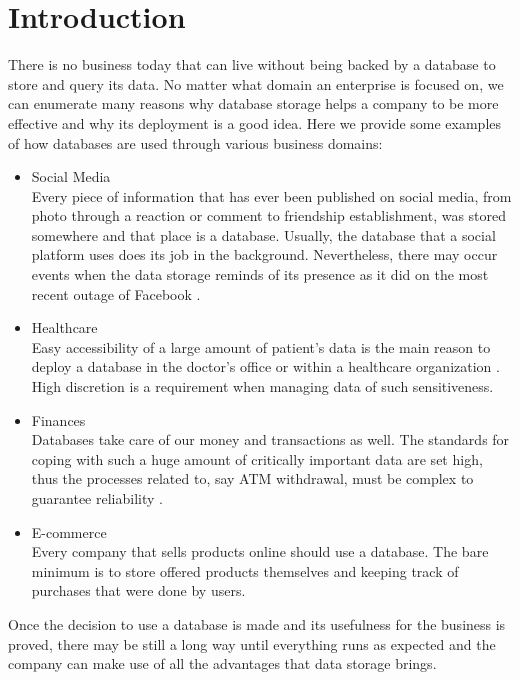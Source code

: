 \chapter{Introduction}

There is no business today that can live without being backed by a database to store and query its data.
No matter what domain an enterprise is focused on, we can enumerate many reasons why database storage helps a company to be more effective and why its deployment is a good idea.
Here we provide some examples of how databases are used through various business domains:

\begin{itemize}
	
	\item Social Media \\
	Every piece of information that has ever been published on social media, from photo through a reaction or comment to friendship establishment, was stored somewhere and that place is a database. Usually, the database that a social platform uses does its job in the background. Nevertheless, there may occur events when the data storage reminds of its presence as it did on the most recent outage of Facebook \cite{Facebook19}.
	
	\item Healthcare \\
	Easy accessibility of a large amount of patient's data is the main reason to deploy a database in the doctor's office or within a healthcare organization \cite{Healthcare13}. High discretion is a requirement when managing data of such sensitiveness.
	
	\item Finances \\
	Databases take care of our money and transactions as well. The standards for coping with such a huge amount of critically important data are set high, thus the processes related to, say ATM withdrawal, must be complex to guarantee reliability \cite{BanksCaixa}.
	
	\item E-commerce \\
	Every company that sells products online should use a database. The bare minimum is to store offered products themselves and keeping track of purchases that were done by users.
\end{itemize}

Once the decision to use a database is made and its usefulness for the business is proved, there may be still a long way until everything runs as expected and the company can make use of all the advantages that data storage brings.

